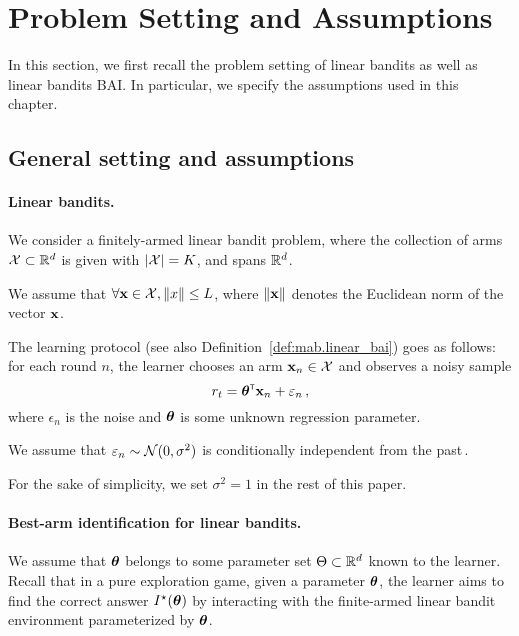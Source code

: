 \section{Problem Setting and Assumptions}\label{sec:lgc.formulation}

In this section, we first recall the problem setting of linear bandits as well as linear bandits BAI. In particular, we specify the assumptions used in this chapter.

\subsection{General setting and assumptions}\label{sec:lgc.formulation.general}

\paragraph{Linear bandits.}
We consider a finitely-armed linear bandit problem, where the collection of arms $\mathcal{X}\subset \mathbb{R}^d$ is given with $|\mathcal{X}|=K$, and spans $\mathbb{R}^d$. 
\begin{assumption}
\begin{leftbar}[assumptionbar]
    We assume that $\forall {\bf x}\in\mathcal{X}, \left\lVert x\right\rVert\leq L$, where $\left\lVert{\bf x}\right\rVert$ denotes the Euclidean norm of the vector ${\bf x}$.
\end{leftbar}
\end{assumption}

The learning protocol (see also Definition~\ref{def:mab.linear_bai}) goes as follows: for each round $n$, the learner chooses an arm ${\bf x}_n\in\mathcal{X}$ and observes a noisy sample
\[
    r_t = {\boldsymbol \theta}^\mathsf{\scriptscriptstyle T}{\bf x}_n +\varepsilon_n\,,
\]
where $\epsilon_n$ is the noise and ${\boldsymbol \theta}$ is some unknown regression parameter.
\begin{assumption}
\begin{leftbar}[assumptionbar]
    We assume that $\varepsilon_n \sim \mathcal{N}(0,\sigma^2)$ is conditionally independent from the past\,.
\end{leftbar}
\end{assumption}
For the sake of simplicity, we set $\sigma^2 = 1$ in the rest of this paper.

\paragraph{Best-arm identification for linear bandits.}
We assume that ${\boldsymbol \theta}$ belongs to some parameter set $\Theta\subset\mathbb{R}^d$ known to the learner. Recall that in a pure exploration game, given a parameter ${\boldsymbol \theta}$, the learner aims to find the correct answer $I^\star({\boldsymbol \theta})$ by interacting with the finite-armed linear bandit environment parameterized by ${\boldsymbol \theta}$.

